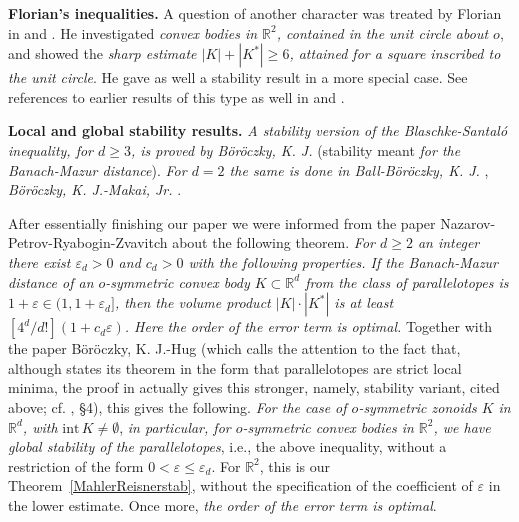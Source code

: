 \documentclass[12pt]{article}
\begin{document}
{\bf{Florian's inequalities.}} 
A question of another character was treated by Florian in \cite{F96} 
and \cite{F98}. 
He investigated {\it{convex bodies in ${\mathbb R}^2$, 
contained in the unit circle about $o$}}, and showed the {\it{sharp estimate
$|K|+|K^*| \ge 6$, attained for a square inscribed to the unit circle}}. 
He gave as well a stability result in a more special
case. See references to earlier results of this type as well 
in \cite{F96} and \cite{F98}.

{\bf{Local and global stability results.}}
{\it{A stability version of the
Blaschke-Santal\'o inequality, for $d \ge 3$, is proved by B\"or\"oczky, 
K. J.}}
\cite{Bo} (stability meant {\it{for the Banach-Mazur distance}}).
{\it{For $d=2$ the same is done in Ball-B\"or\"oczky, K. J.}} \cite{BB}, 
{\it{B\"or\"oczky, K. J.-Makai, Jr.}} \cite{BoMa}. 

After essentially finishing our paper we were informed from the paper
Nazarov-Petrov-Ryabogin-Zvavitch \cite{NPRZ}
about the following theorem. {\it{For $d \ge 2$ an integer there exist
$\varepsilon _d >0$ and $c_d>0$ with the following properties.
If the Banach-Mazur distance of an $o$-symmetric convex body $K \subset
{\mathbb{R}}^d$ from the class of
parallelotopes is $1+ \varepsilon  \in (1, 1+ \varepsilon _d]$, 
then the volume product
$|K| \cdot |K^*|$ is at least $[4^d/d!](1+c_d \varepsilon )$.
Here the order of the error term is optimal.}} Together with the paper
B\"or\"oczky, K. J.-Hug
\cite{BH} (which calls the attention to the fact that,
although \cite{NPRZ} states its theorem in the form that parallelotopes are
strict local minima, the proof in
\cite{NPRZ} actually gives this stronger, namely, 
stability variant, cited above; cf. \cite{NPRZ}, \S 4),
this gives the following. 
{\it{For the case of $o$-symmetric zonoids $K$
in $\mathbb{R}^d$, with}} ${\text{int}}\,K
\ne \emptyset $, {\it{in particular,
for $o$-symmetric convex bodies in $\mathbb{R}^2$,
we have global stability of the parallelotopes}}, i.e.,
the above inequality, without a restriction of the form
$0 < \varepsilon \le \varepsilon _d$. For $\mathbb{R}^2$, 
this is our Theorem~\ref{MahlerReisnerstab}, without the
specification of the coefficient of $\varepsilon $ in the lower estimate.
Once more, {\it{the order of the error term is optimal}}. 
\end{document}
